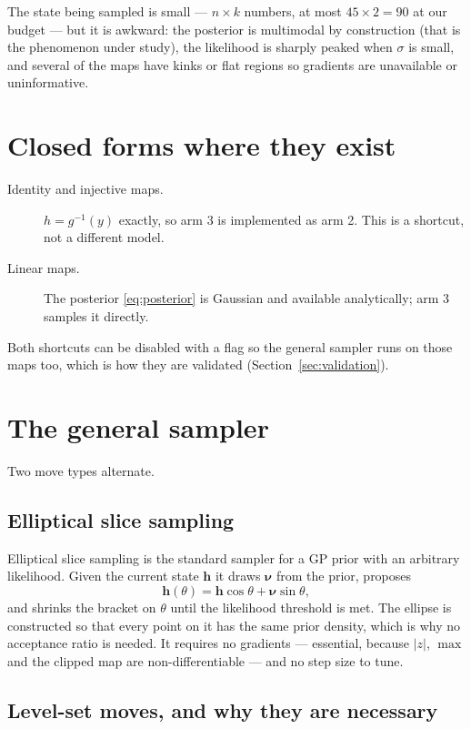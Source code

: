 \documentclass[11pt]{article}
\begin{document}
The state being sampled is small --- $n\times k$ numbers, at most $45\times2=90$
at our budget --- but it is awkward: the posterior is multimodal by construction
(that is the phenomenon under study), the likelihood is sharply peaked when
$\sigma$ is small, and several of the maps have kinks or flat regions so
gradients are unavailable or uninformative.

\section{Closed forms where they exist}

\begin{description}
\item[Identity and injective maps.] $h=g^{-1}(y)$ exactly, so arm 3 is
implemented as arm 2. This is a shortcut, not a different model.
\item[Linear maps.] The posterior \eqref{eq:posterior} is Gaussian and available
analytically; arm 3 samples it directly.
\end{description}
Both shortcuts can be disabled with a flag so the general sampler runs on those
maps too, which is how they are validated (Section~\ref{sec:validation}).

\section{The general sampler}

Two move types alternate.

\subsection{Elliptical slice sampling}

Elliptical slice sampling \cite{murray2010} is the standard sampler for a GP
prior with an arbitrary likelihood. Given the current state $\mathbf{h}$ it draws
$\boldsymbol{\nu}$ from the prior, proposes
\begin{equation}
\mathbf{h}(\theta)=\mathbf{h}\cos\theta+\boldsymbol{\nu}\sin\theta,
\end{equation}
and shrinks the bracket on $\theta$ until the likelihood threshold is met. The
ellipse is constructed so that every point on it has the same prior density,
which is why no acceptance ratio is needed. It requires no gradients ---
essential, because $|z|$, $\max$ and the clipped map are non-differentiable ---
and no step size to tune.

\subsection{Level-set moves, and why they are necessary}
\end{document}
